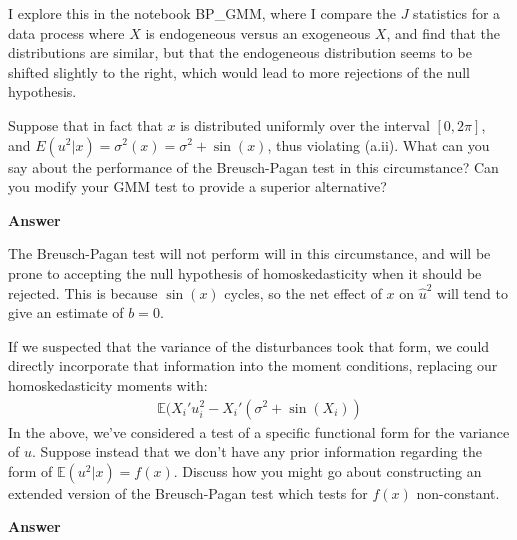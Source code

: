 \documentclass[11pt]{exam}
\begin{document}
\begin{questions}
I explore this in the notebook BP_GMM, where I compare the $J$ statistics for a data process where $X$ is endogeneous versus an exogeneous $X$, and find that the distributions are similar, but that the endogeneous distribution seems to be shifted slightly to the right, which would lead to more rejections of the null hypothesis. 

    \question Suppose that in fact that \(x\) is distributed uniformly
over the interval \([0,2\pi]\), and \(E(u^2|x) = \sigma^2(x) = \sigma^2 + \sin(x)\), thus violating (a.ii). What can you say about the performance of the Breusch-Pagan test in this circumstance? Can you modify your GMM test to provide a superior
alternative?

\textbf{Answer}

The Breusch-Pagan test will not perform will in this circumstance, and
will be prone to accepting the null hypothesis of homoskedasticity when
it should be rejected. This is because \(\sin(x)\) cycles, so the net
effect of \(x\) on \(\hat{u}^2\) will tend to give an estimate of
\(b=0\).

If we suspected that the variance of the disturbances took that form, we
could directly incorporate that information into the moment conditions,
replacing our homoskedasticity moments with:
\begin{align*}
\mathbb{E}(X_i'u_i^2 - X_i'(\sigma^2 +\sin(X_i))
\end{align*}
    \question In the above, we've considered a test of a specific
functional form for the variance of \(u\). Suppose instead that we don't
have any prior information regarding the form of
\(\mathbb{E}(u^2|x) = f(x)\). Discuss how you might go about
constructing an extended version of the Breusch-Pagan test which tests
for \(f(x)\) non-constant.

\textbf{Answer}


\end{questions}
\end{document}
